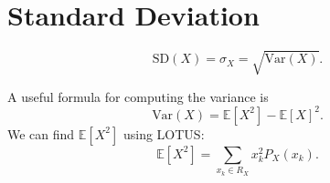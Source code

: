 \section{Standard Deviation}
$$\textrm{SD}(X)= \sigma_X= \sqrt {\textrm{Var}(X)}.$$

A useful formula for computing the variance is 
$$\text{Var}(X) = \mathbb{E}[X^2]-\mathbb{E}[X]^2.$$
We can find $\mathbb{E}[X^2]$ using LOTUS: 
$$\mathbb{E}[X^2] = \sum_{x_k\in R_X}x_k^2P_X(x_k).$$




